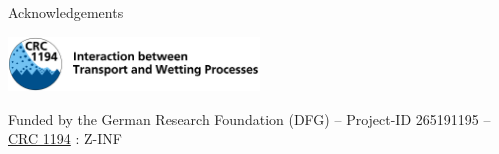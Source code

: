\documentclass[
	aspectratio=169,%
	color={accentcolor=2d},
	logo=true,%
	colorframetitle=true,%
	]{tudabeamer}
\begin{document}

\begin{frame}{Acknowledgements}

    \vfill
    \begin{center}
        \includegraphics[width=0.5\textwidth]{crc-logo}
    \end{center}
    \begin{center}
        Funded by the German Research Foundation (DFG) – Project-ID 265191195 – \href{https://www.sfb1194.tu-darmstadt.de/index.en.jsp}{CRC 1194} : Z-INF
    \end{center}

\end{frame}
\end{document}
